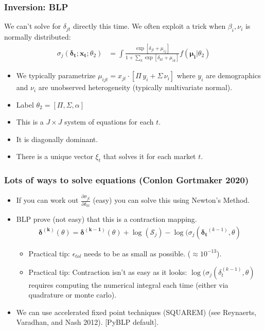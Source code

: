 \begin{frame}
\frametitle{Inversion: BLP}
We can't solve for $\delta_{jt}$ directly this time. We often exploit a trick when $\beta_i,\nu_i$ is normally distributed:
\begin{align*}
\sigma_j(\boldsymbol{\delta_t}; \mathbf{x_t}; \theta_2) &= \int \frac{\exp[\delta_{jt} +  \mu_{ij} ]}{1+\sum_k \exp[\delta_{kt} + \mu_{ik} ]} f(\boldsymbol{\mu_i}| \theta_2)
\end{align*}
 \begin{itemize}
    \item We typically parametrize $\mu_{ijt} = x_{jt} \cdot [\Pi \, y_i + \Sigma \, \nu_{i}]$ where $y_i$ are demographics and $\nu_i$ are unobserved heterogeneity (typically multivariate normal).
    \item Label $\theta_2 = [\Pi, \Sigma, \alpha]$
 \item This is a $J \times J$ system of equations for each $t$.
 \item It is diagonally dominant.
 \item There is a unique vector $\xi_t$ that solves it for each market $t$.
 \end{itemize}
\end{frame}

\begin{frame}
\frametitle{Lots of ways to solve equations (Conlon Gortmaker 2020)}
 \begin{itemize}
     \item If you can work out $\frac{\partial \sigma_{jt}}{\partial \delta_{kt}}$ (easy) you can solve this using Newton's Method. 
 \item BLP prove (not easy) that this is a \alert{contraction mapping}.
\begin{align*}
    \boldsymbol{\delta^{(k)}}(\theta) = \boldsymbol{\delta^{(k-1)}}(\theta) + \log(\mathcal{S}_{j}) - \log(\sigma_{j}(\boldsymbol{\delta_t}^{(k-1)}, \theta)
\end{align*}

\begin{itemize} 
  \item Practical tip: $\epsilon_{tol}$ needs to be as small as possible. ($\approx 10^{-13}$).
 \item Practical tip: Contraction isn't as easy as it looks:  $ \log(\sigma_{j}(\delta_t^{(k-1)}, \theta)$ requires computing the numerical integral each time (either via quadrature or monte carlo).
\end{itemize}
\item We can use \alert{accelerated fixed point} techniques (SQUAREM) (see Reynaerts, Varadhan, and Nash 2012). [PyBLP default].
  \end{itemize}
 \end{frame}


